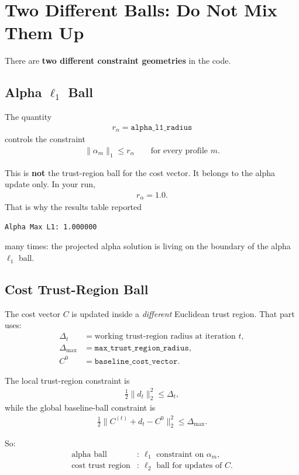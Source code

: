 \documentclass[11pt]{article}
\begin{document}
\section{Two Different Balls: Do Not Mix Them Up}
There are \textbf{two different constraint geometries} in the code.

\subsection{Alpha \texorpdfstring{$\ell_1$}{l1} Ball}
The quantity
\begin{align}
r_\alpha = \texttt{alpha\_l1\_radius}
\end{align}
controls the constraint
\begin{align}
\|\alpha_m\|_1 \le r_\alpha
\qquad \text{for every profile } m.
\end{align}

This is \textbf{not} the trust-region ball for the cost vector. It belongs to
the alpha update only. In your run,
\begin{align}
r_\alpha = 1.0.
\end{align}
That is why the results table reported
\begin{verbatim}
Alpha Max L1: 1.000000
\end{verbatim}
many times: the projected alpha solution is living on the boundary of the alpha
$\ell_1$ ball.

\subsection{Cost Trust-Region Ball}
The cost vector $C$ is updated inside a \emph{different} Euclidean trust region.
That part uses:
\begin{align}
\Delta_t &= \text{working trust-region radius at iteration } t, \\
\Delta_{\max} &= \texttt{max\_trust\_region\_radius}, \\
C^0 &= \texttt{baseline\_cost\_vector}.
\end{align}

The local trust-region constraint is
\begin{align}
\frac{1}{2}\|d_t\|_2^2 \le \Delta_t,
\end{align}
while the global baseline-ball constraint is
\begin{align}
\frac{1}{2}\|C^{(t)} + d_t - C^0\|_2^2 \le \Delta_{\max}.
\end{align}

So:
\begin{align*}
\text{alpha ball} &:\ \ell_1 \text{ constraint on } \alpha_m, \\
\text{cost trust region} &:\ \ell_2 \text{ ball for updates of } C.
\end{align*}
\end{document}
